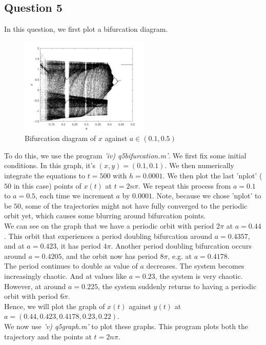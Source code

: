 \documentclass[10pt]{article}
\begin{document}
\subsection*{Question 5}
In this question, we first plot a bifurcation diagram.
\begin{figure}[H]
\centering
\includegraphics[width=0.55\textwidth]{Files/q5.png}
\caption{Bifurcation diagram of $x$ against $a\in(0.1,0.5)$}
\end{figure}
\noindent To do this, we use the program \emph{'iv) q5\textunderscore bifurcation.m'}. We first fix some initial conditions. In this graph, it's $(x,y)=(0.1,0.1)$. We then numerically integrate the equations to $t=500$ with $h=0.0001$. We then plot the last 'nplot' ($50$ in this case) points of $x(t)$ at $t=2n\pi$. We repeat this process from $a=0.1$ to $a=0.5$, each time we increment $a$ by $0.0001$. Note, because we chose 'nplot' to be $50$, some of the trajectories might not have fully converged to the periodic orbit yet, which causes some blurring around bifurcation points.\\
We can see on the graph that we have a periodic orbit with period $2\pi$ at $a=0.44$. This orbit that experiences a period doubling bifurcation around $a=0.4357$, and at $a=0.423$, it has period $4\pi$. Another period doubling bifurcation occurs around $a=0.4205$, and the orbit now has period $8\pi$, e.g. at $a=0.4178$.\\
The period continues to double as value of $a$ decreases. The system becomes increasingly chaotic. And at values like $a=0.23$, the system is very chaotic. However, at around $a=0.225$, the system suddenly returns to having a periodic orbit with period $6\pi$.\\
Hence, we will plot the graph of $x(t)$ against $y(t)$ at $a=(0.44,0.423,0.4178,0.23,0.22)$.\\
We now use \textit{'v) q5\textunderscore graph.m'} to plot these graphs. This program plots both the trajectory and the points at $t=2n\pi$.\\
\end{document}
